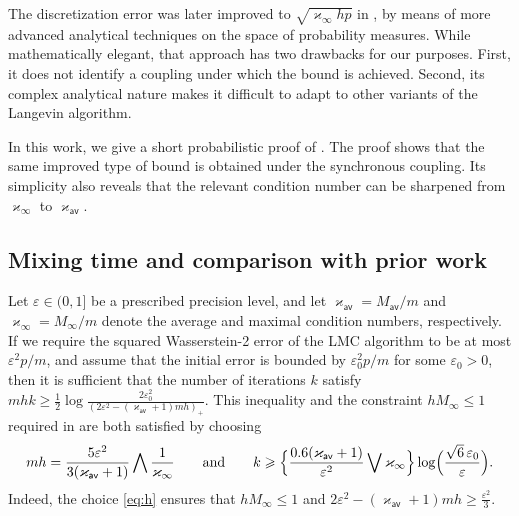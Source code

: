 \documentclass[aos,reqno]{imsart}
\def\kappav{\varkappa_{\textsf{av}}}
\def\kappamax{\varkappa_{\infty}}
\def\Mav{M_{\textsf{av}}}
\def\Mmax{M_{\infty}}
\theoremstyle{definition}
\begin{document}
The discretization error was later improved to
$\sqrt{\kappamax hp}$ in \cite{durmus2019analysis}, by 
means of more advanced analytical techniques on the space 
of probability measures. While mathematically elegant, 
that approach has two drawbacks for our purposes. First, 
it does not identify a coupling under which the bound is 
achieved. Second, its complex analytical nature makes it 
difficult to adapt to other variants of the Langevin
algorithm.

In this work, we give a short probabilistic proof of
. The proof shows that the same improved type 
of bound is obtained under the synchronous coupling. 
Its simplicity also reveals that the relevant condition 
number can be sharpened from $\kappamax$ to $\kappav$. 

\subsection{Mixing time and comparison with prior work}
\label{ssec:2.2}

Let $\varepsilon\in(0,1]$ be a prescribed precision
level, and let $\kappav = \Mav/m$ and
$\kappamax = \Mmax/m$ denote the average and maximal
condition numbers, respectively. If we require the
squared Wasserstein-2 error of the LMC algorithm to be
at most $\varepsilon^2 p/m$, and assume that the initial
error is bounded by $\varepsilon_0^2 p/m$ for some
$\varepsilon_0>0$, then it is sufficient that the number
of iterations $k$ satisfy
$mhk\geqslant \frac{1}{2}\log 
\frac{2\varepsilon_0^2} {(2\varepsilon^2 - 
(\kappav+1)mh)_+}$. This inequality and the 
constraint $h\Mmax\leqslant 1$ required in  
are both satisfied by choosing
\begin{align}\label{eq:h}
    mh = \frac{5\varepsilon^2}{3(\kappav + 1)}
    \bigwedge \frac{1}{\kappamax}\qquad
    \text{and}\qquad
    k \geqslant \Big\{\frac{0.6(\kappav +1)}{
    \varepsilon^2} \bigvee {\kappamax}
    \Big\}\log \Bigl(\frac{\sqrt{6}\,\varepsilon_0}{
    \varepsilon}\Bigr).
\end{align}
Indeed, the choice \eqref{eq:h} ensures that
$h\Mmax\leqslant 1$ and $2\varepsilon^2 - (\kappav+1)
mh\geqslant\frac{\varepsilon^2}{3}$.
\end{document}

